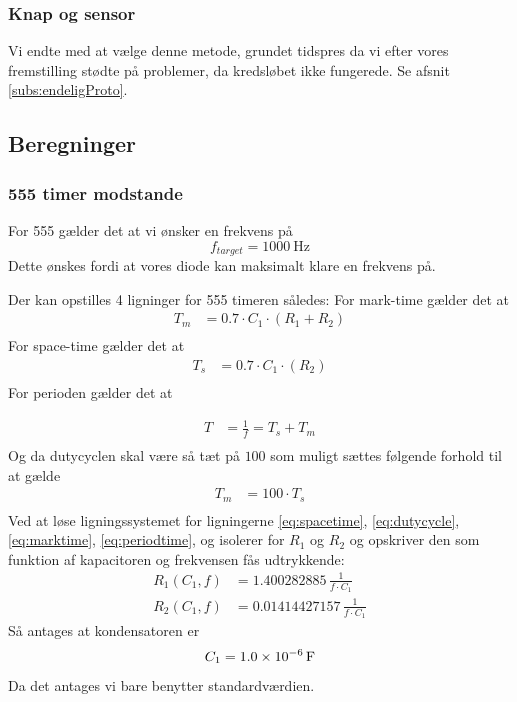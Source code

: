 \subsubsection{Knap og sensor}
Vi endte med at vælge denne metode, grundet tidspres da vi efter vores fremstilling stødte på problemer, da kredsløbet ikke fungerede. Se afsnit \ref{subs:endeligProto}.
\subsection{Beregninger}
\subsubsection{555 timer modstande}
For 555 gælder det at vi ønsker en frekvens på 
\[
	f_{target} =  \SI{1000}{\hertz}
\]
Dette ønskes fordi at vores diode kan maksimalt klare en frekvens på.

Der kan opstilles 4 ligninger for 555 timeren således: 
For mark-time gælder det at
\begin{align}
	T_m &= 0.7 \cdot C_1 \cdot (R_1 + R_2) \label{eq:marktime} \\
\end{align}
For space-time gælder det at 
\begin{align}
	T_s &= 0.7 \cdot C_1 \cdot (R_2) \label{eq:spacetime} \\
\end{align}
For perioden gælder det at 

\begin{align}
	T &= \frac{1}{f} = T_s + T_m \label{eq:periodtime} \\
\end{align}
Og da dutycyclen skal være så tæt på $100$ som muligt sættes følgende forhold til at gælde
\begin{align}
	T_m &= 100 \cdot  T_s \label{eq:dutycycle} \\
\end{align}
Ved at løse ligningssystemet for ligningerne \ref{eq:spacetime}, \ref{eq:dutycycle}, \ref{eq:marktime}, \ref{eq:periodtime}, og isolerer for $R_1$ og $R_2$ og opskriver den som funktion af kapacitoren og frekvensen fås udtrykkende:
\begin{align}
	R_{1} \left( C_1,f \right) &= 1.400282885\,{\frac {1}{f \cdot C_1}} \\[2ex]
	R_{2} \left( C_1,f \right) &= 0.01414427157\,{\frac {1}{f \cdot C_1}}
\end{align}
Så antages at kondensatoren er 
\[
	C_1 = \SI{1.0d-6}{\farad}
\]
Da det antages vi bare benytter standardværdien. 

